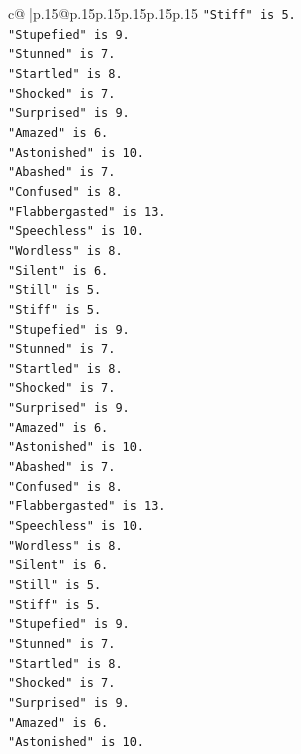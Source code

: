 \documentclass{article}
\begin{document}
{\begin{supertabular}{c@{$\;$}|p{.15\linewidth}@{}p{.15\linewidth}p{.15\linewidth}p{.15\linewidth}p{.15\linewidth}p{.15\linewidth}}
{{{\texttt{"Stiff" is 5.} \\
\texttt{"Stupefied" is 9.} \\
\texttt{"Stunned" is 7.} \\
\texttt{"Startled" is 8.} \\
\texttt{"Shocked" is 7.} \\
\texttt{"Surprised" is 9.} \\
\texttt{"Amazed" is 6.} \\
\texttt{"Astonished" is 10.} \\
\texttt{"Abashed" is 7.} \\
\texttt{"Confused" is 8.} \\
\texttt{"Flabbergasted" is 13.} \\
\texttt{"Speechless" is 10.} \\
\texttt{"Wordless" is 8.} \\
\texttt{"Silent" is 6.} \\
\texttt{"Still" is 5.} \\
\texttt{"Stiff" is 5.} \\
\texttt{"Stupefied" is 9.} \\
\texttt{"Stunned" is 7.} \\
\texttt{"Startled" is 8.} \\
\texttt{"Shocked" is 7.} \\
\texttt{"Surprised" is 9.} \\
\texttt{"Amazed" is 6.} \\
\texttt{"Astonished" is 10.} \\
\texttt{"Abashed" is 7.} \\
\texttt{"Confused" is 8.} \\
\texttt{"Flabbergasted" is 13.} \\
\texttt{"Speechless" is 10.} \\
\texttt{"Wordless" is 8.} \\
\texttt{"Silent" is 6.} \\
\texttt{"Still" is 5.} \\
\texttt{"Stiff" is 5.} \\
\texttt{"Stupefied" is 9.} \\
\texttt{"Stunned" is 7.} \\
\texttt{"Startled" is 8.} \\
\texttt{"Shocked" is 7.} \\
\texttt{"Surprised" is 9.} \\
\texttt{"Amazed" is 6.} \\
\texttt{"Astonished" is 10.} \\
}}}
\end{supertabular}}
\end{document}
